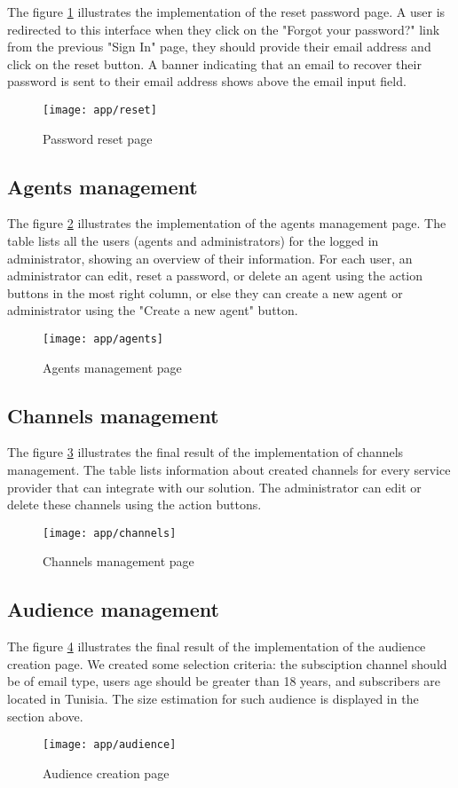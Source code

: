 The figure \ref{ss-reset} illustrates the implementation of the reset password page. A user is redirected to
this interface when they click on the "Forgot your password?" link from the previous "Sign In" page,
they should provide their email address and click on the reset button. A banner indicating that an email
to recover their password is sent to their email address shows above the email input field.
\begin{figure}[hbt!]
    \centering
    \texttt{[image: app/reset]}
    \caption{Password reset page}
    \label{ss-reset}
\end{figure}

\subsection{Agents management}
The figure \ref{ss-agents} illustrates the implementation of the agents management page.
The table lists all the users (agents and administrators) for the logged in administrator, showing
an overview of their information. For each user, an administrator can edit, reset a password, or delete
an agent using the action buttons in the most right column, or else they can create a new
agent or administrator using the "Create a new agent" button.

\begin{figure}[hbt!]
    \centering
    \texttt{[image: app/agents]}
    \caption{Agents management page}
    \label{ss-agents}
\end{figure}

\subsection{Channels management}
The figure \ref{ss-channels} illustrates the final result of the implementation of channels management. The table
lists information about created channels for every service provider that can integrate with our solution. The
administrator can edit or delete these channels using the action buttons.
\begin{figure}[hbt!]
    \centering
    \texttt{[image: app/channels]}
    \caption{Channels management page}
    \label{ss-channels}
\end{figure}

\subsection{Audience management}
The figure \ref{ss-audience} illustrates the final result of the implementation of the audience creation page.
We created some selection criteria: the subsciption channel should be of email type, users age should be greater
than 18 years, and subscribers are located in Tunisia. The size estimation for such audience is displayed in the section above.
\begin{figure}[hbt!]
    \centering
    \texttt{[image: app/audience]}
    \caption{Audience creation page}
    \label{ss-audience}
\end{figure}


